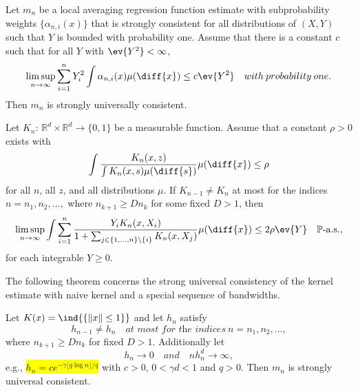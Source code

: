 \begin{lemma} \label{lemma23.3}%
Let $m_n$ be a local averaging regression function estimate with subprobability weights $\{\alpha_{n,i}(x)\}$ that is strongly consistent for all distributions of $(X,Y)$ such that $Y$ is bounded with probability one. Assume that there is a constant $c$ such that for all $Y$ with $\ev{Y^2}<\infty$,
\[\limsup_{n \to \infty} \sum_{i=1}^{n}Y_i^2 \int \alpha_{n,i}(x) \mu(\diff{x}) \leq c\ev{Y^2} \quad with \: probability \: one.\]
Then $m_n$ is strongly universally consistent.
\end{lemma}

\begin{lemma} \label{lemma23.5} %
Let $K_n$: $\mathbb{R}^d \times \mathbb{R}^d \to \{0,1\}$ be a measurable function. Assume that a constant $\rho>0$ exists with
\[\int \frac{K_n(x,z)}{\int K_n(x,s) \mu(\diff{s})} \mu(\diff{x}) \leq \rho\]
for all $n$, all $z$, and all distributions $\mu$. If $K_{n-1} \neq K_n$ at most for the indices $n=n_1,n_2,...,$ where $n_{k+1} \geq Dn_k$ for some fixed $D>1$, then
\[\limsup_{n\to\infty} \int \sum_{i=1}^{n} \frac{Y_i K_n(x,X_i)}{1+\sum_{j\in\{1,...,n\}\setminus\{i\}} K_n(x,X_j)} \mu(\diff{x}) \leq 2\rho \ev{Y} \quad\mathbb{P}\text{-a.s.},\]
for each integrable $Y\geq0.$
\end{lemma}

The following theorem concerns the strong universal consistency of the kernel estimate with naive kernel and a special sequence of bandwidths.
\begin{theorem} \label{kernelsuc}
Let $K(x) = \ind{\{\|x\|\leq1\}}$ and let $h_n$ satisfy 
\[h_{n-1} \neq h_n \quad \textit{at most for the indices} \ n=n_1,n_2,...,\]
where $n_{k+1} \geq Dn_k$ for fixed $D>1$. Additionally let 
\[ h_n \to 0 \quad and \quad nh_n^d \to \infty,\]
e.g., \colorbox{yellow}{$h_n = ce^{-\gamma \lfloor q \log n \rfloor/q}$} with $c>0$, $0<\gamma d<1$ and $q>0$. Then $m_n$ is strongly universal consistent.
\end{theorem}

